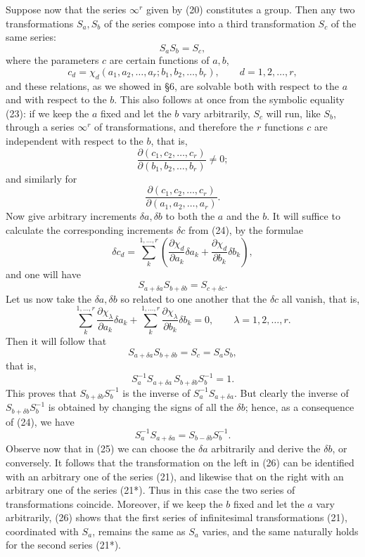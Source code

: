 \documentclass[11pt]{book}
\begin{document}
Suppose now that the series $\infty^r$ given by (20) constitutes a group. Then any two transformations $S_a,S_b$ of the series compose into a third transformation $S_c$ of the same series:
\begin{equation*}\tag{23}
 S_aS_b=S_c,
\end{equation*}
where the parameters $c$ are certain functions of $a,b$,
\begin{equation*}\tag{24}
 c_d=\chi_d(a_1,a_2,\ldots,a_r; b_1,b_2,\ldots,b_r),\qquad d=1,2,\ldots,r,
\end{equation*}
and these relations, as we showed in \S{}6, are solvable both with respect to the $a$ and with respect to the $b$. This also follows at once from the symbolic equality (23): if we keep the $a$ fixed and let the $b$ vary arbitrarily, $S_c$ will run, like $S_b$, through a series $\infty^r$ of transformations, and therefore the $r$ functions $c$ are independent with respect to the $b$, that is,
\[
 \frac{\partial(c_1,c_2,\ldots,c_r)}{\partial(b_1,b_2,\ldots,b_r)}\ne0;
\]
and similarly for
\[
 \frac{\partial(c_1,c_2,\ldots,c_r)}{\partial(a_1,a_2,\ldots,a_r)}.
\]
Now give arbitrary increments $\delta a,\delta b$ to both the $a$ and the $b$. It will suffice to calculate the corresponding increments $\delta c$ from (24), by the formulae
\[
 \delta c_d=\sum\limits_k^{1,\ldots,r}\left(\frac{\partial\chi_d}{\partial a_k}\delta a_k+\frac{\partial\chi_d}{\partial b_k}\delta b_k\right),
\]
and one will have
\[
 S_{a+\delta a}S_{b+\delta b}=S_{c+\delta c}.
\]
Let us now take the $\delta a,\delta b$ so related to one another that the $\delta c$ all vanish, that is,
\begin{equation*}\tag{25}
 \sum\limits_k^{1,\ldots,r}\frac{\partial\chi_\lambda}{\partial a_k}\delta a_k+
 \sum\limits_k^{1,\ldots,r}\frac{\partial\chi_\lambda}{\partial b_k}\delta b_k=0,
 \qquad \lambda=1,2,\ldots,r.
\end{equation*}
Then it will follow that
\[
 S_{a+\delta a}S_{b+\delta b}=S_c=S_aS_b,
\]
that is,
\[
 S_a^{-1}S_{a+\delta a}\, S_{b+\delta b}S_b^{-1}=1.
\]
This proves that $S_{b+\delta b}S_b^{-1}$ is the inverse of $S_a^{-1}S_{a+\delta a}$. But clearly the inverse of $S_{b+\delta b}S_b^{-1}$ is obtained by changing the signs of all the $\delta b$; hence, as a consequence of (24), we have
\begin{equation*}\tag{26}
 S_a^{-1}S_{a+\delta a}=S_{b-\delta b}S_b^{-1}.
\end{equation*}
Observe now that in (25) we can choose the $\delta a$ arbitrarily and derive the $\delta b$, or conversely. It follows that the transformation on the left in (26) can be identified with an arbitrary one of the series (21), and likewise that on the right with an arbitrary one of the series (21*). Thus in this case the two series of transformations coincide. Moreover, if we keep the $b$ fixed and let the $a$ vary arbitrarily, (26) shows that the first series of infinitesimal transformations (21), coordinated with $S_a$, remains the same as $S_a$ varies, and the same naturally holds for the second series (21*).
\end{document}
